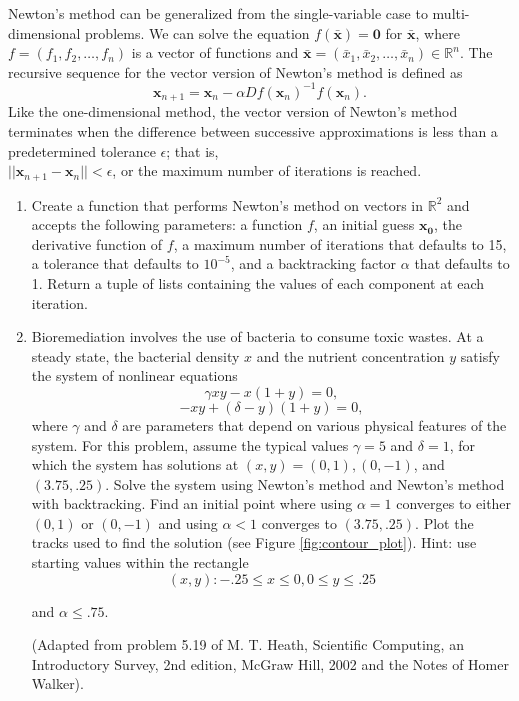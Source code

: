 Newton's method can be generalized from the single-variable case to multi-dimensional problems. We can solve the equation $f(\mathbf{\bar{x}})=\mathbf{0}$ for $\mathbf{\bar{x}}$, where $f=(f_1,f_2,\dots,f_n)$ is a vector of functions and $\mathbf{\bar{x}}=(\bar{x}_1, \bar{x}_2,\dots,\bar{x}_n)\in\mathbb{R}^n$. The recursive sequence for the vector version of Newton's method is defined as 
\[
\mathbf{x}_{n+1} = \mathbf{x}_n - \alpha{Df(\mathbf{x}_n)}^{-1}{f(\mathbf{x}_n)}.
\]
Like the one-dimensional method, the vector version of Newton's method terminates when the difference between successive approximations is less than a predetermined tolerance $\epsilon$; that is, \\$||\mathbf{x}_{n+1}-\mathbf{x}_n||<\epsilon$, or the maximum number of iterations is reached.
\begin{problem}
\begin{enumerate}

\item Create a function that performs Newton's method on vectors in $\mathbb{R}^2$ and accepts the following parameters: a function $f$, an initial guess $\mathbf{x_0}$, the derivative function of $f$, a maximum number of iterations that defaults to 15, a tolerance that defaults to $10^{-5}$, and a backtracking factor $\alpha$ that defaults to 1. Return a tuple of lists containing the values of each component at each iteration.
\item Bioremediation involves the use of bacteria to consume toxic wastes.
At a steady state, the bacterial density $x$ and the nutrient concentration $y$ satisfy the system of nonlinear equations
\[
\gamma xy - x(1 + y) = 0,
\]
\[
 -xy + (\delta - y)(1 + y) = 0,
\]
where $\gamma$ and $\delta$ are parameters that depend on various physical features of the system.
For this problem, assume the typical values $\gamma = 5$ and $\delta = 1$, for which the system has solutions at $(x, y) = (0, 1), (0, -1)$, and $(3.75, .25)$.
Solve the system using Newton's method and Newton's method with backtracking.
Find an initial point where using $\alpha = 1$ converges to either $(0, 1)$ or $(0, -1)$ and using $\alpha < 1$ converges to $(3.75, .25).$
Plot the tracks used to find the solution (see Figure \ref{fig:contour_plot}).
Hint: use starting values within the rectangle
\[
{(x, y) : -.25 \leqslant x \leqslant 0, 0 \leqslant y \leqslant .25}
\]

and $\alpha\leq.75$.

(Adapted from problem 5.19 of M. T. Heath, Scientific Computing, an Introductory Survey, 2nd edition, McGraw Hill, 2002 and the Notes of Homer Walker).
\end{enumerate}
\end{problem}

